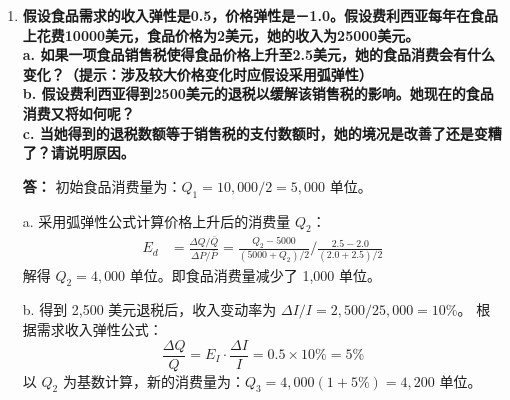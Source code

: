 \begin{enumerate}[label=\textbf{\arabic*.}, leftmargin=*]
	a.书籍是正常品，咖啡的收入弹性无法确定。\\捡到20美元（意外的正向收入冲击）使他立即增加了书籍的消费，说明书籍的收入弹性为正，没有看出他对咖啡消费的改变，所以无法判断咖啡。
	
	b.书籍是正常品，咖啡是劣等品或者说必需品。\\丢失10美元是实际购买力的净损失（负向收入冲击)。在比尔的收入下降时，会卖掉新书（对书的需求下降），说明书籍是正常品；而他不惜卖书也要维持咖啡的消费，说明咖啡在收入下降时其需求未减反增，甚至优先维持），属于劣等品或者说必需品。
	
	c. 无法确定两者的收入弹性。\\这是价格同比例变动引发的价格效应（包含替代效应与收入效应），在未明确比尔名义收入是否发生变动以及变动幅度的情况下，无法分离出纯粹的收入弹性。
	
	d.咖啡和书籍是劣等品，《华尔街日报》和瓶装矿泉水是正常品。\\获得MBA学位通常伴随着收入的显著提升。当比尔的收入增加后，咖啡和书籍的需求直接降低到0，这说明其收入弹性为负，而对报纸和矿泉水的需求的增加说明其收入弹性为正。
	
	\item \textbf{假设食品需求的收入弹性是0.5，价格弹性是－1.0。假设费利西亚每年在食品上花费10000美元，食品价格为2美元，她的收入为25000美元。\\
		a. 如果一项食品销售税使得食品价格上升至2.5美元，她的食品消费会有什么变化？（提示：涉及较大价格变化时应假设采用弧弹性）\\
		b. 假设费利西亚得到2500美元的退税以缓解该销售税的影响。她现在的食品消费又将如何呢？\\
		c. 当她得到的退税数额等于销售税的支付数额时，她的境况是改善了还是变糟了？请说明原因。}
	
	\textbf{答：}
	初始食品消费量为：$Q_1 = 10,000 / 2 = 5,000$ 单位。
	
	a. 采用弧弹性公式计算价格上升后的消费量 $Q_2$：
	\[
	\begin{aligned}
		E_d &= \frac{\Delta Q / \bar{Q}}{\Delta P / \bar{P}} = \frac{Q_2 - 5000}{(5000 + Q_2)/2} / \frac{2.5 - 2.0}{(2.0 + 2.5)/2}
	\end{aligned}
	\]
	解得 $Q_2 = 4,000$ 单位。即食品消费量减少了 1,000 单位。
	
	b. 得到 2,500 美元退税后，收入变动率为 $\Delta I / I = 2,500 / 25,000 = 10\%$。
	根据需求收入弹性公式：
	\[
	\frac{\Delta Q}{Q} = E_I \cdot \frac{\Delta I}{I} = 0.5 \times 10\% = 5\%
	\]
	以 $Q_2$ 为基数计算，新的消费量为：$Q_3 = 4,000(1 + 5\%) = 4,200$ 单位。
	

\end{enumerate}
